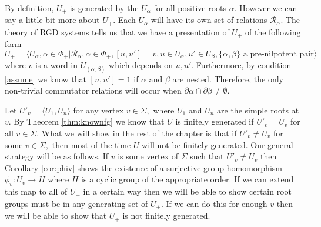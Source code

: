 \documentclass[class=book, crop=false,12 pt]{standalone}
\begin{document}

By definition, $U_+$ is generated by the $U_\alpha$ for all positive roots $\alpha.$ However we can say a little bit more about $U_+.$ Each $U_\alpha$ will have its own set of relations $\mathcal{R}_\alpha.$ The theory of RGD systems tells us that we have a presentation of $U_+$ of the following form
\[
	U_+=\langle U_\alpha,\alpha\in \Phi_+|\mathcal{R}_\alpha,\alpha\in \Phi_+,[u,u']=v,u\in U_\alpha,u'\in U_\beta,\{\alpha,\beta\} \text{ a pre-nilpotent pair}\rangle
\]
where $v$ is a word in $U_{(\alpha,\beta)}$ which depends on $u,u'.$ Furthermore, by condition \eqref{assume} we know that $[u,u']=1$ if $\alpha$ and $\beta$ are nested. Therefore, the only non-trivial commutator relations will occur when $\partial\alpha\cap \partial\beta\neq \emptyset.$

Let $U'_v=\langle U_1,U_n\rangle$ for any vertex $v\in \Sigma,$ where $U_1$ and $U_n$ are the simple roots at $v.$ By Theorem \ref{thm:knownfg} we know that $U$ is finitely generated if $U'_v=U_v$ for all $v\in \Sigma.$ What we will show in the rest of the chapter is that if $U'_v\neq U_v$ for some $v\in \Sigma,$ then most of the time $U$ will not be finitely generated. Our general strategy will be as follows. If $v$ is some vertex of $\Sigma$ such that $U'_v\neq U_v$ then Corollary \ref{cor:phiv} shows the existence of a surjective group homomorphism $\phi_v:U_v\to H$ where $H$ is a cyclic group of the appropriate order. If we can extend this map to all of $U_+$ in a certain way then we will be able to show certain root groups must be in any generating set of $U_+.$ If we can do this for enough $v$ then we will be able to show that $U_+$ is not finitely generated.
\end{document}

